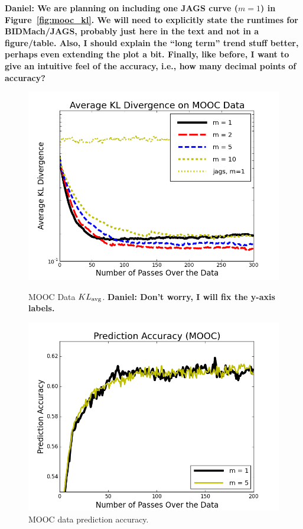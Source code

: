 \documentclass{article} %
\begin{document}
\textbf{Daniel: We are planning on including one JAGS curve ($m=1$) in Figure~\ref{fig:mooc_kl}. We
will need to explicitly state the runtimes for BIDMach/JAGS, probably just here in the text and not
in a figure/table. Also, I should explain the ``long term'' trend stuff better, perhaps even
extending the plot a bit. Finally, like before, I want to give an intuitive feel of the accuracy,
i.e., how many decimal points of accuracy?}

\begin{figure}[t]
  \centering
  \begin{minipage}{.5\textwidth}
    \centering
    \includegraphics[width=1\textwidth]{fig_mooc_kl_div.png}
    \caption{MOOC Data $KL_{\rm avg}$. \textbf{Daniel: Don't worry, I will fix the y-axis labels.}}
    \label{fig:mooc_kl}
  \end{minipage}\hfill
    \begin{minipage}{.5\textwidth}
    \centering
    \includegraphics[width=1\textwidth]{fig_prediction_accuracy_mooc}
    \caption{MOOC data prediction accuracy.}
    \label{fig:mooc_accuracy}
  \end{minipage}
\end{figure}
\end{document}
